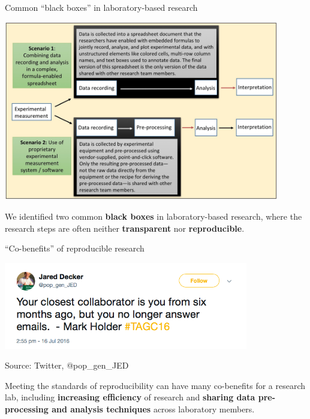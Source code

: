 \documentclass[ignorenonframetext,]{beamer}
\begin{document}
\begin{frame}{Common ``black boxes'' in laboratory-based research}
\protect\hypertarget{common-black-boxes-in-laboratory-based-research}{}

\begin{center}\includegraphics[width=0.9\textwidth]{figures/existing_blackboxes} \end{center}

\small

We identified two common \textbf{black boxes} in laboratory-based
research, where the research steps are often neither
\textbf{transparent} nor \textbf{reproducible}.

\end{frame}

\begin{frame}{``Co-benefits'' of reproducible research}
\protect\hypertarget{co-benefits-of-reproducible-research}{}

\begin{center}\includegraphics[width=0.8\textwidth]{figures/own_worst_collaborator} \end{center}

\vspace{-0.4cm}

\scriptsize Source: Twitter, @pop\_gen\_JED

\bigskip

\normalsize Meeting the standards of reproducibility can have many
co-benefits for a research lab, including \textbf{increasing efficiency}
of research and \textbf{sharing data pre-processing and analysis
techniques} across laboratory members.

\end{frame}
\end{document}
